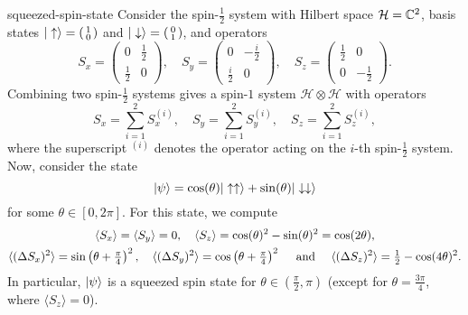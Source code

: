 \begin{example}{squeezed-spin-state}
    Consider the spin-$\tfrac{1}{2}$ system with Hilbert space $\mathcal{H} = \mathbb{C}^2$, basis states $|\uparrow\rangle = \left(\begin{smallmatrix} 1 \\ 0 \end{smallmatrix}\right)$ and $|\downarrow\rangle = \left(\begin{smallmatrix} 0 \\ 1 \end{smallmatrix}\right)$, and operators
    \[ S_x = \begin{pmatrix} 0 & \tfrac{1}{2} \\ \tfrac{1}{2} & 0 \end{pmatrix}, \quad S_y = \begin{pmatrix} 0 & - \tfrac{i}{2} \\ \tfrac{i}{2} & 0 \end{pmatrix}, \quad S_z = \begin{pmatrix} \tfrac{1}{2} & 0 \\ 0 & - \tfrac{1}{2} \end{pmatrix} . \]
    Combining two spin-$\tfrac{1}{2}$ systems gives a spin-$1$ system $\mathcal{H} \otimes \mathcal{H}$ with operators
    \[ S_x = \sum_{i = 1}^{2} S_x^{(i)}, \quad S_y = \sum_{i = 1}^{2} S_y^{(i)}, \quad S_z = \sum_{i = 1}^{2} S_z^{(i)} , \]
    where the superscript $^{(i)}$ denotes the operator acting on the $i$-th spin-$\tfrac{1}{2}$ system. Now, consider the state
    \[ |\psi\rangle = \cos(\theta) |\uparrow \uparrow\rangle + \sin(\theta) |\downarrow \downarrow\rangle \]
    for some $\theta \in [0, 2 \pi]$. For this state, we compute
    \[ \begin{gathered}
        \langle S_x \rangle = \langle S_y \rangle = 0, \quad \langle S_z \rangle = \cos(\theta)^2 - \sin(\theta)^2 = \cos(2 \theta) , \\
        \langle (\Delta S_x)^2 \rangle = \sin \left( \theta + \tfrac{\pi}{4} \right)^2, \quad \langle (\Delta S_y)^2 \rangle = \cos \left( \theta + \tfrac{\pi}{4} \right)^2 \quad \textup{ and } \quad \langle (\Delta S_z)^2 \rangle = \tfrac{1}{2} - \cos(4 \theta)^2 .
    \end{gathered} \]
    In particular, $|\psi\rangle$ is a squeezed spin state for $\theta \in \left(\tfrac{\pi}{2}, \pi\right)$ (except for $\theta = \tfrac{3 \pi}{4}$, where $\langle S_z \rangle = 0$).
\end{example}

